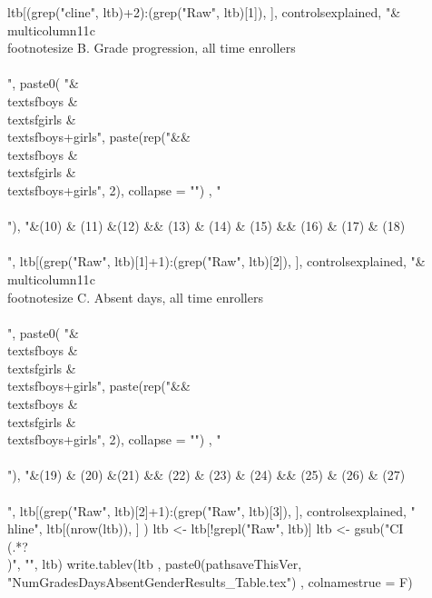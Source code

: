 \begin{Schunk}
\begin{Sinput}
  ltb[(grep("cline", ltb)+2):(grep("Raw", ltb)[1]), ],
  controlsexplained,
  "&\\multicolumn{11}{c}{\\footnotesize B. Grade progression, all time enrollers}\\\\", 
    paste0(
      "&\\textsf{boys} & \\textsf{girls} & \\textsf{boys+girls}",
      paste(rep("&&\\textsf{boys} & \\textsf{girls} & \\textsf{boys+girls}", 2), collapse = "")
      , "\\\\"),
    "&(10) & (11) &(12) && (13) & (14) & (15) && (16) & (17) & (18)\\\\", 
  ltb[(grep("Raw", ltb)[1]+1):(grep("Raw", ltb)[2]), ],
  controlsexplained, 
  "&\\multicolumn{11}{c}{\\footnotesize C. Absent days, all time enrollers}\\\\", 
    paste0(
      "&\\textsf{boys} & \\textsf{girls} & \\textsf{boys+girls}",
      paste(rep("&&\\textsf{boys} & \\textsf{girls} & \\textsf{boys+girls}", 2), collapse = "")
      , "\\\\"),
    "&(19) & (20) &(21) && (22) & (23) & (24) && (25) & (26) & (27)\\\\", 
  ltb[(grep("Raw", ltb)[2]+1):(grep("Raw", ltb)[3]), ],
  controlsexplained, 
  "\\hline",
  ltb[(nrow(ltb)), ]
  )
ltb <- ltb[!grepl("Raw", ltb)]
ltb <- gsub("CI \\(.*?\\)", "", ltb)
write.tablev(ltb
  ,  paste0(pathsaveThisVer, "NumGradesDaysAbsentGenderResults_Table.tex")
  ,  colnamestrue = F)
\end{Sinput}
\end{Schunk}
